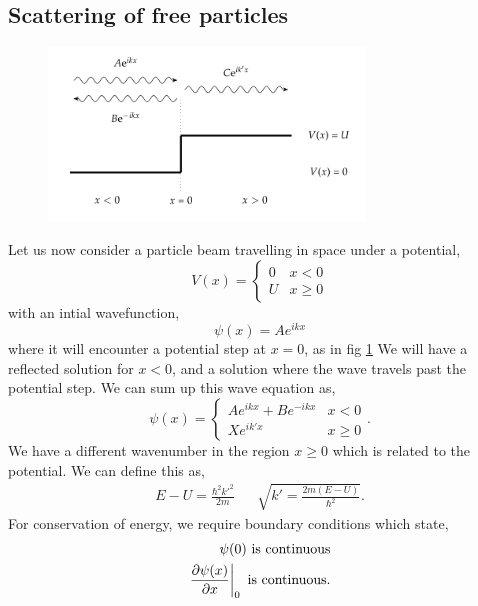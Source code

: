 \documentclass{book}
\begin{document}
\subsection{Scattering of free particles}
\begin{figure}
	\centering
	\includegraphics[width=0.75\textwidth]{potential.png}
	\caption{}
	\label{fig:potential barrier}
\end{figure}
Let us now consider a particle beam travelling in space under a potential,
\begin{equation}
	V(x) = \begin{cases}
		0 & x < 0 \\
		U & x \geq 0
	\end{cases}
\end{equation}
with an intial wavefunction,
\begin{equation}
	\psi(x) = Ae^{ikx}
\end{equation}
where it will encounter a potential step at $x = 0$, as in fig \ref{fig:potential barrier} We will have a reflected solution for $x<0$, and a solution where the wave travels past the potential step. We can sum up this wave equation as,
\begin{equation}
	\psi(x) = \begin{cases}
		Ae^{ikx} + Be^{-ikx} & x<0 \\
		Xe^{ik'x} & x \geq 0
	\end{cases}.
\end{equation}
We have a different wavenumber in the region $x \geq 0$ which is related to the potential. We can define this as,
\begin{align}
	E - U = \frac{\hbar^2k'^2}{2m} && \sqrt{k' = \frac{2m(E-U)}{\hbar^2}}.
\end{align}
For conservation of energy, we require boundary conditions which state,
\begin{align}
	\psi(0) \text{ is continuous} \label{eq:conti1} \\
	\eval{\pdv{\psi(x)}{x}}_{0} \text{ is continuous} \label{eq:conti2}.
\end{align}
\end{document}
